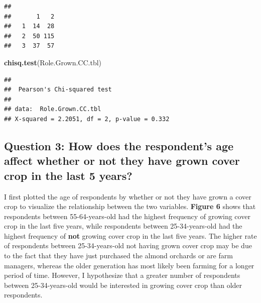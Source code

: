 \documentclass[12pt,]{article}
\newenvironment{Shaded}{\begin{snugshade}}{\end{snugshade}}
\newcommand{\KeywordTok}[1]{\textcolor[rgb]{0.13,0.29,0.53}{\textbf{#1}}}
\newcommand{\NormalTok}[1]{#1}
\begin{document}
\begin{verbatim}
##    
##       1   2
##   1  14  28
##   2  50 115
##   3  37  57
\end{verbatim}

\begin{Shaded}
\begin{Highlighting}[]
\KeywordTok{chisq.test}\NormalTok{(Role.Grown.CC.tbl)}
\end{Highlighting}
\end{Shaded}

\begin{verbatim}
## 
##  Pearson's Chi-squared test
## 
## data:  Role.Grown.CC.tbl
## X-squared = 2.2051, df = 2, p-value = 0.332
\end{verbatim}

\subsection{Question 3: How does the respondent's age affect whether or
not they have grown cover crop in the last 5
years?}\label{question-3-how-does-the-respondents-age-affect-whether-or-not-they-have-grown-cover-crop-in-the-last-5-years}

I first plotted the age of respondents by whether or not they have grown
a cover crop to visualize the relationship between the two variables.
\textbf{Figure 6} shows that respondents between 55-64-years-old had the
highest frequency of growing cover crop in the last five years, while
respondents between 25-34-years-old had the highest frequency of
\textbf{not} growing cover crop in the last five years. The higher rate
of respondents between 25-34-years-old not having grown cover crop may
be due to the fact that they have just purchased the almond orchards or
are farm managers, whereas the older generation has most likely been
farming for a longer period of time. However, I hypothesize that a
greater number of respondents between 25-34-years-old would be
interested in growing cover crop than older respondents.

  \providecommand{\huxb}[2]{\arrayrulecolor[RGB]{#1}\global\arrayrulewidth=#2pt}
  \providecommand{\huxvb}[2]{\color[RGB]{#1}\vrule width #2pt}
  \providecommand{\huxtpad}[1]{\rule{0pt}{\baselineskip+#1}}
  \providecommand{\huxbpad}[1]{\rule[-#1]{0pt}{#1}}
\end{document}
